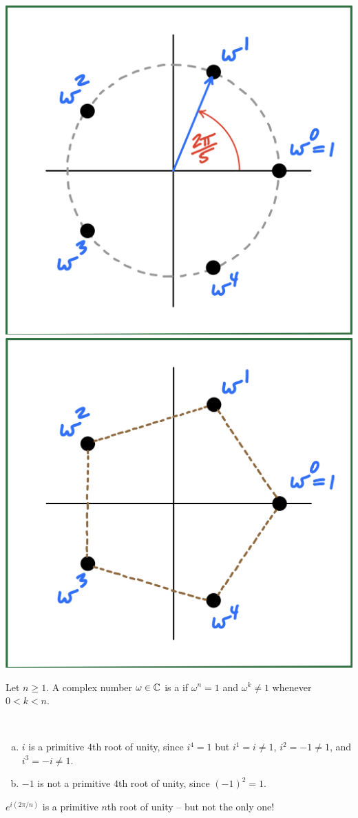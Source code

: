 \documentclass[11pt,fleqn,dvipsnames,usenames]{article}
\begin{document}
\begin{center}
\includegraphics[width=0.3\linewidth]{fifthrootsunity}\hspace{4cm} \includegraphics[width=0.3\linewidth]{fifthrootsunityhexagon}
\end{center}
%
\begin{definition} Let $n\geq 1$.  A complex number $\omega\in\mathbb{C}$ is a  if $\omega^{n} = 1$ and $\omega^{k}\neq 1$ whenever $0 < k < n$.
\end{definition}
%
\begin{examples}~
\begin{enumerate}[(a)]
\item $i$ is a primitive $4$th root of unity, since $i^{4} = 1$ but $i^{1} = i\neq 1$, $i^{2} = -1\neq 1$, and $i^3 = -i\neq 1$.
\item $-1$ is not a primitive $4$th root of unity, since $(-1)^2 = 1$.
\end{enumerate}
\end{examples}
\vsmsp

%
\note $e^{i(2\pi/n)}$ is a primitive $n$th root of unity -- but not the only one!
\vsmsp
\end{document}
